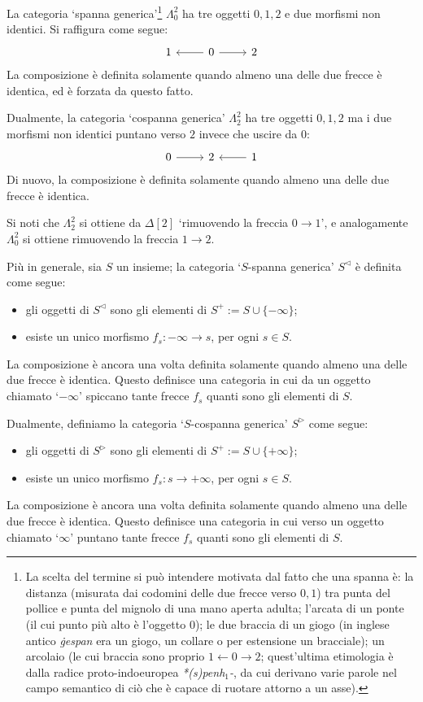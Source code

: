 \begin{example}\label{ex_spancospan}
	La categoria `spanna generica'\footnote{La scelta del termine si può intendere motivata dal fatto che una spanna è: la distanza (misurata dai codomini delle due frecce verso $0,1$) tra punta del pollice e punta del mignolo di una mano aperta adulta; l'arcata di un ponte (il cui punto più alto è l'oggetto $0$); le due braccia di un giogo (in inglese antico \emph{ġespan} era un giogo, un collare o per estensione un bracciale); un arcolaio (le cui braccia sono proprio $1\leftarrow 0\to 2$; quest'ultima etimologia è dalla radice proto-indoeuropea \emph{*(s)penh$_1$-}, da cui derivano varie parole nel campo semantico di ciò che è capace di ruotare attorno a un asse).} 
\(\Lambda^2_0\) ha tre oggetti \(0,1,2\) e due morfismi non identici. Si raffigura come segue:
	\[\begin{tikzcd}
			1 & 0 \ar[r]\ar[l] & 2
		\end{tikzcd}\]
	La composizione è definita solamente quando almeno una delle due frecce è identica, ed è forzata da questo fatto.

	Dualmente, la categoria `cospanna generica' \(\Lambda^2_2\) ha tre oggetti \(0,1,2\) ma i due morfismi non identici puntano verso \(2\) invece che uscire da \(0\):
	\[\begin{tikzcd}
			0\ar[r] & 2 & 1\ar[l]
		\end{tikzcd}\]
	Di nuovo, la composizione è definita solamente quando almeno una delle due frecce è identica.

	Si noti che \(\Lambda^2_2\) si ottiene da \(\Delta[2]\) `rimuovendo la freccia \(0\to 1\)', e analogamente \(\Lambda^2_0\) si ottiene rimuovendo la freccia \(1\to 2\).

	Più in generale, sia \(S\) un insieme; la categoria `\(S\)-spanna generica' \(S^\lhd\) è definita come segue:
	\begin{itemize}
		\item gli oggetti di \(S^\lhd\) sono gli elementi di \(S^+ := S\cup \{-\infty\}\);
		\item esiste un unico morfismo \(f_s : -\infty\to s\), per ogni \(s\in S\).
	\end{itemize}
	La composizione è ancora una volta definita solamente quando almeno una delle due frecce è identica. Questo definisce una categoria in cui da un oggetto chiamato `\(-\infty\)' spiccano tante frecce \(f_s\) quanti sono gli elementi di \(S\).

	Dualmente, definiamo la categoria `\(S\)-cospanna generica' \(S^\rhd\) come segue:
	\begin{itemize}
		\item gli oggetti di \(S^\rhd\) sono gli elementi di \(S^+ := S\cup \{+\infty\}\);
		\item esiste un unico morfismo \(f_s : s\to+\infty\), per ogni \(s\in S\).
	\end{itemize}
	La composizione è ancora una volta definita solamente quando almeno una delle due frecce è identica. Questo definisce una categoria in cui verso un oggetto chiamato `\(\infty\)' puntano tante frecce \(f_s\) quanti sono gli elementi di \(S\).


\end{example}
